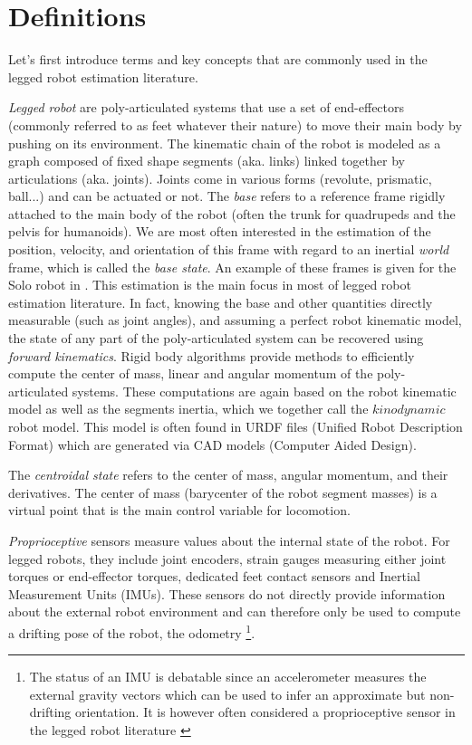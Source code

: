 \section{Definitions}
\label{sec:def}
Let's first introduce terms and key concepts that are commonly used in the legged robot estimation literature.

\textit{Legged robot} are poly-articulated systems that use a set of end-effectors (commonly referred to as feet whatever their nature) to move their main body
by pushing on its environment. The kinematic chain of the robot is modeled as a graph composed of fixed shape segments (aka. links) 
linked together by articulations (aka. joints). Joints come in various forms (revolute, prismatic, ball...) and can be actuated or not.
The \textit{base} refers to a reference frame rigidly attached to the main body of the robot (often the trunk for quadrupeds and the pelvis for humanoids). 
We are most often interested in the estimation of the position, velocity, and orientation of this frame with regard to an inertial \textit{world} frame, which is called the \textit{base state}. 
An example of these frames is given for the Solo robot in .
This estimation is the main focus in most of legged robot estimation literature. In fact, knowing the base and other quantities directly measurable (such as joint angles), 
and assuming a perfect robot kinematic model, the state of any part of the poly-articulated system can be recovered using \textit{forward kinematics}. Rigid body algorithms
\cite{featherstone2014rigid} provide methods to efficiently compute the center of mass, linear and angular momentum of the  poly-articulated systems. These computations
are again based on the robot kinematic model as well as the segments inertia, which we together call the $kinodynamic$ robot model. This model is often 
found in URDF files (Unified Robot Description Format) which are generated via CAD models (Computer Aided Design).

The \textit{centroidal state} refers to the center of mass, angular momentum, and their derivatives. The center 
of mass (barycenter of the robot segment masses) is a virtual point that is the main control variable for locomotion. 

\textit{Proprioceptive} sensors measure values about the internal state of the robot. For legged robots, they include joint encoders, strain gauges measuring 
either joint torques or end-effector torques, dedicated feet contact sensors and Inertial Measurement Units (IMUs). These sensors do not directly provide information
about the external robot environment and can therefore only be used to compute a drifting pose of the robot, the odometry \footnote{The status of an IMU is debatable
since an accelerometer measures the external gravity vectors which can be used to infer an approximate but non-drifting orientation. It is however often considered 
a proprioceptive sensor in the legged robot literature \cite{rotella2018unsupervised,scona2017direct,yang2019state,lin2021deep}}. 

